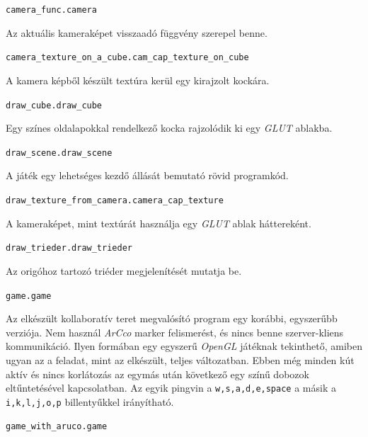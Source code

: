 \bigskip

\noindent \texttt{camera\_func.camera}

\medskip

Az aktuális kameraképet visszaadó függvény szerepel benne.
	
\bigskip

\noindent \texttt{camera\_texture\_on\_a\_cube.cam\_cap\_texture\_on\_cube}

\medskip

A kamera képből készült textúra kerül egy kirajzolt kockára.

\bigskip

\noindent \texttt{draw\_cube.draw\_cube}

\medskip

Egy színes oldalapokkal rendelkező kocka rajzolódik ki egy \textit{GLUT} ablakba.
	
\bigskip

\noindent \texttt{draw\_scene.draw\_scene}

\medskip
	
A játék egy lehetséges kezdő állását bemutató rövid programkód.

\bigskip

\noindent \texttt{draw\_texture\_from\_camera.camera\_cap\_texture}

\medskip

A kameraképet, mint textúrát használja egy \textit{GLUT} ablak háttereként.

\bigskip

\noindent \texttt{draw\_trieder.draw\_trieder}

\medskip

Az origóhoz tartozó triéder megjelenítését mutatja be.

\bigskip

\noindent \texttt{game.game}

\medskip

Az elkészült kollaboratív teret megvalósító program egy korábbi, egyszerűbb verziója.
Nem használ \textit{ArCco} marker felismerést, és nincs benne szerver-kliens kommunikáció.
Ilyen formában egy egyszerű \textit{OpenGL} játéknak tekinthető, amiben ugyan az a feladat, mint az elkészült, teljes változatban.
Ebben még minden kút aktív és nincs korlátozás az egymás után következő egy színű dobozok eltűntetésével kapcsolatban.
Az egyik pingvin a \texttt{w,s,a,d,e,space} a másik a \texttt{i,k,l,j,o,p} billentyűkkel irányítható.
	
\bigskip

\noindent \texttt{game\_with\_aruco.game}

